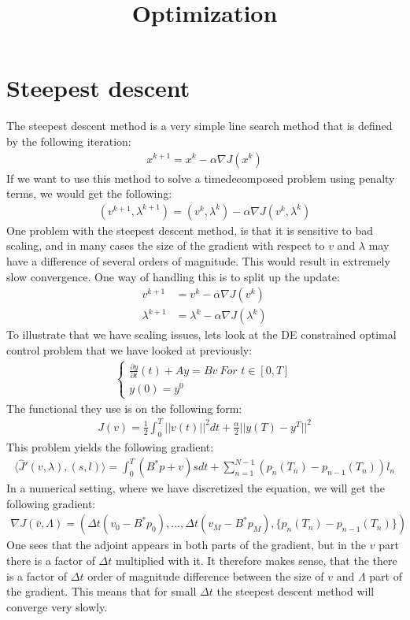 \documentclass[11pt,a4paper]{article}
\title{Optimization}
\begin{document}
\section{Steepest descent}
The steepest descent method is a very simple line search method that is defined by the following iteration:
\begin{align*}
x^{k+1} = x^k - \alpha\nabla J(x^k)
\end{align*}
If we want to use this method to solve a timedecomposed problem using penalty terms, we would get the following:
\begin{align*}
(v^{k+1},\lambda^{k+1})= (v^k,\lambda^k)-\alpha\nabla J(v^k,\lambda^k)
\end{align*}
One problem with the steepest descent method, is that it is sensitive to bad scaling, and in many cases the size of the gradient with respect to $v$ and $\lambda$ may have a difference of several orders of magnitude. This would result in extremely slow convergence. One way of handling this is to split up the update:
\begin{align*}
v^{k+1} &= v^k - \alpha\nabla J(v^k)\\
\lambda^{k+1} &= \lambda^k - \alpha\nabla J(\lambda^k)
\end{align*}
To illustrate that we have scaling issues, lets look at the DE constrained optimal control problem that we have looked at previously:
\begin{align}
	\left\{
     \begin{array}{lr}
		\frac{\partial y}{\partial t}(t)+Ay=Bv  \ \textit{For $t \in [0,T]$}\\
		y(0)=y^0
	\end{array}
	\right. \label{OC_PDE}
\end{align}
The functional they use is on the following form:
\begin{align}
J(v) = \frac{1}{2}\int_0^T ||v(t)||^2 dt + \frac{\alpha}{2}||y(T)-y^T||^2 \label{OC_func}
\end{align}
This problem yields the following gradient:
\begin{align}
\langle\hat{J}'(v,\lambda),(s,l) \rangle = \int_0^T (B^*p+v)sdt + \sum_{n=1}^{N-1}(p_n(T_n) - p_{n-1}(T_n))l_n \label{penalty grad}
\end{align}
In a numerical setting, where we have discretized the equation, we will get the following gradient:
\begin{align*}
\nabla J(\bar{v},\Lambda) = (\Delta t (v_0-B^*p_0),...,\Delta t (v_{M}-B^*p_M),\{p_n(T_n) - p_{n-1}(T_n)\})
\end{align*}
One sees that the adjoint appears in both parts of the gradient, but in the $v$ part there is a factor of $\Delta t$ multiplied with it. It therefore makes sense, that the there is a factor of $\Delta t$ order of magnitude difference between the size of $v$ and $\Lambda$ part of the gradient. This means that for small $\Delta t$ the steepest descent method will converge very slowly.
\end{document}
